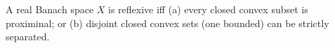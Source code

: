 A real Banach space $X$ is reflexive iff (a) every closed convex subset is proximinal; or (b) disjoint closed convex sets (one bounded) can be strictly separated.
